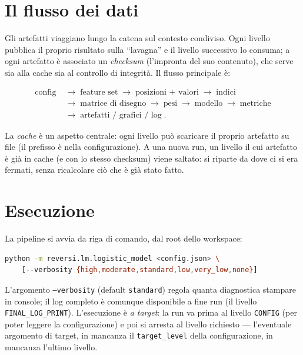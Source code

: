 \section{Il flusso dei dati}

Gli artefatti viaggiano lungo la catena sul contesto condiviso. Ogni livello
pubblica il proprio risultato sulla ``lavagna'' e il livello successivo lo
consuma; a ogni artefatto è associato un \emph{checksum} (l'impronta del suo
contenuto), che serve sia alla cache sia al controllo di integrità. Il flusso
principale è:

\[
\begin{aligned}
\text{config} &\;\to\; \text{feature set} \;\to\; \text{posizioni + valori}
               \;\to\; \text{indici} \\
               &\;\to\; \text{matrice di disegno} \;\to\; \text{pesi}
               \;\to\; \text{modello} \;\to\; \text{metriche} \\
               &\;\to\; \text{artefatti / grafici / log}\;.
\end{aligned}
\]

La \emph{cache} è un aspetto centrale: ogni livello può scaricare il proprio
artefatto su file (il prefisso è nella configurazione). A una nuova run, un
livello il cui artefatto è già in cache (e con lo stesso checksum) viene
saltato: si riparte da dove ci si era fermati, senza ricalcolare ciò che è
già stato fatto.

\section{Esecuzione}

La pipeline si avvia da riga di comando, dal root dello workspace:

\begin{lstlisting}[language=bash, caption={Avvio della pipeline.}]
python -m reversi.lm.logistic_model <config.json> \
    [--verbosity {high,moderate,standard,low,very_low,none}]
\end{lstlisting}

L'argomento \texttt{--verbosity} (default \texttt{standard}) regola quanta
diagnostica stampare in console; il log completo è comunque disponibile a fine
run (il livello \texttt{FINAL\_LOG\_PRINT}). L'esecuzione è \emph{a target}: la
run va prima al livello \texttt{CONFIG} (per poter leggere la configurazione) e
poi si arresta al livello richiesto — l'eventuale argomento di target, in
mancanza il \texttt{target\_level} della configurazione, in mancanza l'ultimo
livello.
